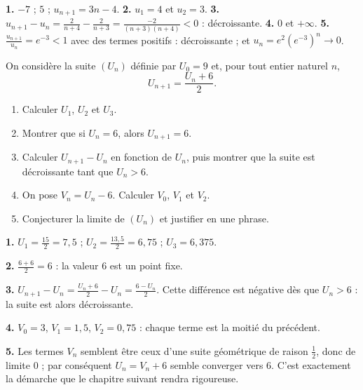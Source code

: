 \begin{corrige}[je me teste]
\textbf{1.} $-7$ ; $5$ ; $u_{n+1} = 3n-4$.
\textbf{2.} $u_{1} = 4$ et $u_{2} = 3$.
\textbf{3.} $u_{n+1}-u_{n} = \frac{2}{n+4}-\frac{2}{n+3}
= \frac{-2}{(n+3)(n+4)}<0$ : décroissante.
\textbf{4.} $0$ et $+\infty$.
\textbf{5.} $\frac{u_{n+1}}{u_{n}} = e^{-3}<1$ avec des termes positifs :
décroissante ; et $u_{n} = e^{2}\left(e^{-3}\right)^{n} \to 0$.
\end{corrige}

\begin{commeaubac}
On considère la suite $\left(U_{n}\right)$ définie par $U_{0} = 9$ et, pour
tout entier naturel $n$,
\[
  U_{n+1} = \frac{U_{n}+6}{2}.
\]

\begin{enumerate}[label=\textbf{\arabic*.}, leftmargin=*, itemsep=0.25em]
  \item Calculer $U_{1}$, $U_{2}$ et $U_{3}$. \bareme{1 pt}
  \item Montrer que si $U_{n} = 6$, alors $U_{n+1} = 6$. 
  \item Calculer $U_{n+1}-U_{n}$ en fonction de $U_{n}$, puis montrer que la
        suite est décroissante tant que $U_{n}>6$. 
  \item On pose $V_{n} = U_{n}-6$. Calculer $V_{0}$, $V_{1}$ et $V_{2}$.
        \bareme{1 pt}
  \item Conjecturer la limite de $\left(U_{n}\right)$ et justifier en une
        phrase. \bareme{1 pt}
\end{enumerate}
\end{commeaubac}

\begin{corrige}
\textbf{1.} $U_{1} = \frac{15}{2} = 7{,}5$ ; $U_{2} = \frac{13{,}5}{2}
= 6{,}75$ ; $U_{3} = 6{,}375$.

\textbf{2.} $\frac{6+6}{2} = 6$ : la valeur $6$ est un point fixe.

\textbf{3.} $U_{n+1}-U_{n} = \frac{U_{n}+6}{2}-U_{n}
= \frac{6-U_{n}}{2}$. Cette différence est négative dès que $U_{n}>6$ :
la suite est alors décroissante.

\textbf{4.} $V_{0} = 3$, $V_{1} = 1{,}5$, $V_{2} = 0{,}75$ : chaque terme
est la moitié du précédent.

\textbf{5.} Les termes $V_{n}$ semblent être ceux d'une suite géométrique de
raison $\frac12$, donc de limite $0$ ; par conséquent $U_{n} = V_{n}+6$
semble converger vers $6$. C'est exactement la démarche que le chapitre
suivant rendra rigoureuse.
\end{corrige}


